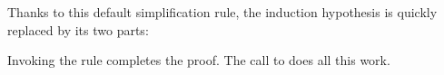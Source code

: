 \begin{isabellebody}
\begin{isamarkuptxt}
\begin{isabelle}
\end{isabelle}
Thanks to this default simplification rule, the induction hypothesis 
is quickly replaced by its two parts:
\begin{trivlist}
\item {}
\item {}
\end{trivlist}
Invoking the rule  completes the proof.  The
call to  does all this work.


\end{isamarkuptxt}
\end{isabellebody}
